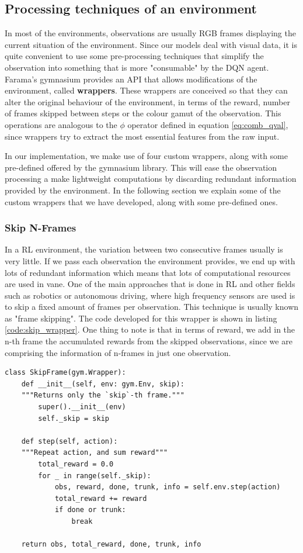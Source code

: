 \subsection{Processing techniques of an environment}
\label{sec:proc_env}

In most of the environments, observations are usually RGB frames displaying the current situation of the environment. Since our models deal with visual data, it is quite convenient to use some pre-processing techniques that simplify the observation into something that is more "consumable" by the DQN agent. Farama's gymnasium provides an API that allows modifications of the environment, called \textbf{wrappers}. These wrappers are conceived so that they can alter the original behaviour of the environment, in terms of the reward, number of frames skipped between steps or the colour gamut of the observation. This operations are analogous to the $\phi$ operator defined in equation \ref{eq:comb_qval}, since wrappers try to extract the most essential features from the raw input.

In our implementation, we make use of four custom wrappers, along with some pre-defined offered by the gymnasium library. This will ease the observation processing a make lightweight computations by discarding redundant information provided by the environment. In the following section we explain some of the custom wrappers that we have developed, along with some pre-defined ones.

\subsubsection{Skip N-Frames}
\label{sec:skip_wrapper}
In a RL environment, the variation between two consecutive frames usually is very little. If we pass each observation the environment provides, we end up with lots of redundant information which means that lots of computational resources are used in vane. One of the main approaches that is done in RL and other fields such as robotics or autonomous driving, where high frequency sensors are used is to skip a fixed amount of frames per observation. This technique is usually known as "frame skipping". The code developed for this wrapper is shown in listing \ref{code:skip_wrapper}. One thing to note is that in terms of reward, we add in the n-th frame the accumulated rewards from the skipped observations, since we are comprising the information of n-frames in just one observation.

\begin{lstlisting}[caption={Frame skip wrapper}, label={code:skip_wrapper}]
class SkipFrame(gym.Wrapper):
	def __init__(self, env: gym.Env, skip):
	"""Returns only the `skip`-th frame."""
		super().__init__(env)
		self._skip = skip
	
	def step(self, action):
	"""Repeat action, and sum reward"""
		total_reward = 0.0
		for _ in range(self._skip):
			obs, reward, done, trunk, info = self.env.step(action)
			total_reward += reward
			if done or trunk:
				break
	
	return obs, total_reward, done, trunk, info

\end{lstlisting}

